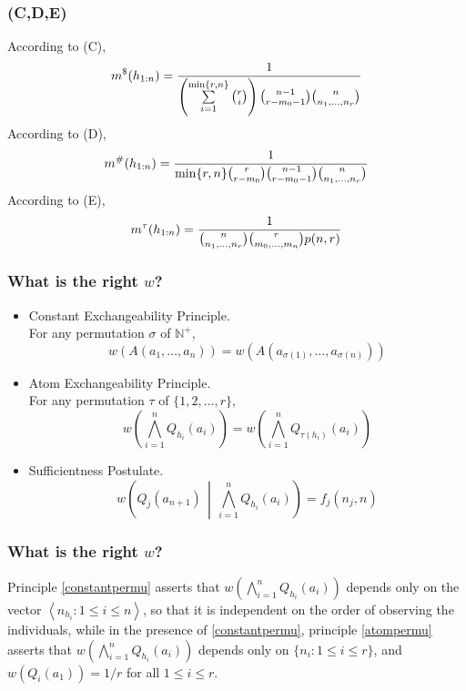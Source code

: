 \documentclass[UTF8,11pt,colorlinks,compress,openany]{beamer}%
\begin{document}
\begin{frame}\frametitle{(C,D,E)}
	According to (C),
	\[m^\$(h_{1:n})=\dfrac{1}{\left(\sum\limits_{i=1}^{\min\{r,n\}}\binom{r}{i}\right)\binom{n-1}{r-m_0-1}\binom{n}{n_1,\ldots,n_r}}\index{$m^\$$}\]
	According to (D),
	\[m^\#(h_{1:n})=\dfrac{1}{\min\{r,n\}\binom{r}{r-m_0}\binom{n-1}{r-m_0-1}\binom{n}{n_1,\ldots,n_r}}\index{$m^\#$}\]
	According to (E),
	\[m^\tau(h_{1:n})=\dfrac{1}{\binom{n}{n_1,\ldots,n_r}\binom{r}{m_0,\ldots,m_n}p(n,r)}\index{$m^\tau$}\]
\end{frame}

\begin{frame}\frametitle{What is the right $w$?}
	\begin{itemize}
		\item Constant Exchangeability Principle.\\
		For any permutation $\sigma$ of $\mathbb{N}^+$,
		\begin{equation}
		w(A(a_1,\ldots,a_n))=w(A(a_{\sigma(1)},\ldots,a_{\sigma(n)})) \tag{Ex}\label{constantpermu}
		\end{equation}
		\item Atom Exchangeability Principle.\\
		For any permutation $\tau$ of $\{1,2,\ldots,r\}$,
		\begin{equation}
		w\left(\bigwedge\limits_{i=1}^n Q_{h_i}(a_i)\right)=w\left(\bigwedge\limits_{i=1}^n Q_{\tau(h_i)}(a_i)\right) \tag{Ax}\label{atompermu}
		\end{equation}
		\item Sufficientness Postulate.
		\[w\left(Q_j(a_{n+1})\,\middle|\,\bigwedge\limits_{i=1}^n Q_{h_i}(a_i)\right)=f_j(n_j,n) \tag{SP}\label{sufficientp}\]
	\end{itemize}
\end{frame}

\begin{frame}\frametitle{What is the right $w$?}
	Principle \ref{constantpermu} asserts that $w\left(\bigwedge\limits_{i=1}^n Q_{h_i}(a_i)\right)$ depends only on the vector $\left\langle n_{h_i}: 1\leq i\leq n\right\rangle$, so that it is independent on the order of observing the individuals, while in the presence of \ref{constantpermu}, principle \ref{atompermu} asserts that $w\left(\bigwedge\limits_{i=1}^n Q_{h_i}(a_i)\right)$ depends only on $\{n_i: 1\leq i\leq r\}$, and $w(Q_i(a_1))=1/r$ for all $1\leq i\leq r$.
\end{frame}
\end{document}
